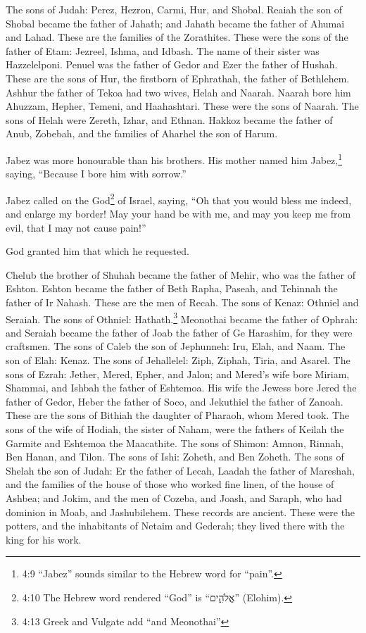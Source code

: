  The sons of Judah: Perez, Hezron, Carmi, Hur, and Shobal.
 Reaiah the son of Shobal became the father of Jahath; and
Jahath became the father of Ahumai and Lahad. These are the families of
the Zorathites.  These were the sons of the father of Etam:
Jezreel, Ishma, and Idbash. The name of their sister was Hazzelelponi.
 Penuel was the father of Gedor and Ezer the father of
Hushah. These are the sons of Hur, the firstborn of Ephrathah, the
father of Bethlehem.  Ashhur the father of Tekoa had two
wives, Helah and Naarah.  Naarah bore him Ahuzzam, Hepher,
Temeni, and Haahashtari. These were the sons of Naarah.  The
sons of Helah were Zereth, Izhar, and Ethnan.  Hakkoz became
the father of Anub, Zobebah, and the families of Aharhel the son of
Harum.

 Jabez was more honourable than his brothers. His mother
named him Jabez,\footnote{4:9 ``Jabez'' sounds similar to the Hebrew
  word for ``pain''.} saying, ``Because I bore him with sorrow.''

 Jabez called on the God\footnote{4:10 The Hebrew word
  rendered ``God'' is ``אֱלֹהִ֑ים'' (Elohim).} of Israel, saying, ``Oh
that you would bless me indeed, and enlarge my border! May your hand be
with me, and may you keep me from evil, that I may not cause pain!''

God granted him that which he requested.

 Chelub the brother of Shuhah became the father of Mehir,
who was the father of Eshton.  Eshton became the father of
Beth Rapha, Paseah, and Tehinnah the father of Ir Nahash. These are the
men of Recah.  The sons of Kenaz: Othniel and Seraiah. The
sons of Othniel: Hathath.\footnote{4:13 Greek and Vulgate add ``and
  Meonothai''}  Meonothai became the father of Ophrah: and
Seraiah became the father of Joab the father of Ge Harashim, for they
were craftsmen.  The sons of Caleb the son of Jephunneh:
Iru, Elah, and Naam. The son of Elah: Kenaz.  The sons of
Jehallelel: Ziph, Ziphah, Tiria, and Asarel.  The sons of
Ezrah: Jether, Mered, Epher, and Jalon; and Mered's wife bore Miriam,
Shammai, and Ishbah the father of Eshtemoa.  His wife the
Jewess bore Jered the father of Gedor, Heber the father of Soco, and
Jekuthiel the father of Zanoah. These are the sons of Bithiah the
daughter of Pharaoh, whom Mered took.  The sons of the wife
of Hodiah, the sister of Naham, were the fathers of Keilah the Garmite
and Eshtemoa the Maacathite.  The sons of Shimon: Amnon,
Rinnah, Ben Hanan, and Tilon. The sons of Ishi: Zoheth, and Ben Zoheth.
 The sons of Shelah the son of Judah: Er the father of
Lecah, Laadah the father of Mareshah, and the families of the house of
those who worked fine linen, of the house of Ashbea;  and
Jokim, and the men of Cozeba, and Joash, and Saraph, who had dominion in
Moab, and Jashubilehem. These records are ancient.  These
were the potters, and the inhabitants of Netaim and Gederah; they lived
there with the king for his work.

